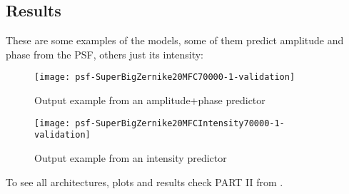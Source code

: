 	\subsection{Results}
		These are some examples of the models, some of them predict amplitude and phase from the PSF, others just its intensity:
		
		\begin{figure*}[ht!]
			\centering
			\texttt{[image: 
		psf-SuperBigZernike20MFC70000-1-validation]}
			\caption{Output example from an amplitude+phase predictor}
		\end{figure*}
		
		\begin{figure*}[ht!]
			\centering
			\texttt{[image: 
		psf-SuperBigZernike20MFCIntensity70000-1-validation]}
			\caption{Output example from an intensity predictor}
		\end{figure*}
		\FloatBarrier
		
		To see all architectures, plots and results check PART II from .
	
		